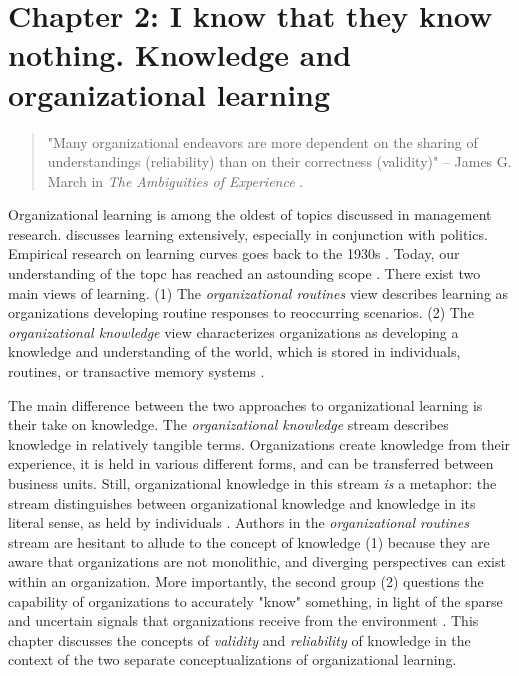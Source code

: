 \section{Chapter 2: I know that they know nothing. Knowledge and organizational learning}

\begin{singlespace}
	\begin{quote}
		"Many organizational endeavors are more dependent on the sharing of understandings (reliability) than on their correctness (validity)" -- James G. March in \textit{The Ambiguities of Experience} \citep[p. 69]{March2010}.
	\end{quote}
\end{singlespace}

Organizational learning is among the oldest of topics discussed in management research. \citet{March1963} discusses learning extensively, especially in conjunction with politics. Empirical research on learning curves goes back to the 1930s \citep{Wright1936}. Today, our understanding of the topc has reached an astounding scope \citep{Argote2013}. There exist two main views of learning. (1) The \textit{organizational routines} view describes learning as organizations developing routine responses to reoccurring scenarios. (2) The \textit{organizational knowledge} view characterizes organizations as developing a knowledge and understanding of the world, which is stored in individuals, routines, or transactive memory systems \citep{Argote2011}.

The main difference between the two approaches to organizational learning is their take on knowledge. The \textit{organizational knowledge} stream describes knowledge in relatively tangible terms. Organizations create knowledge from their experience, it is held in various different forms, and can be transferred between business units. Still, organizational knowledge in this stream \textit{is} a metaphor: the stream distinguishes between organizational knowledge and knowledge in its literal sense, as held by individuals \citep{Argote2011}. Authors in the \textit{organizational routines} stream are hesitant to allude to the concept of knowledge (1) because they are aware that organizations are not monolithic, and diverging perspectives can exist within an organization. More importantly, the second group (2) questions the capability of organizations to accurately "know" something, in light of the sparse and uncertain signals that organizations receive from the environment \citep{March1975}. This chapter discusses the concepts of \textit{validity} and \textit{reliability} of knowledge in the context of the two separate conceptualizations of organizational learning.

